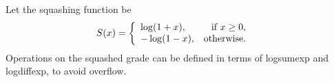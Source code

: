 \documentclass[a4paper, 12pt]{article}
\title{}
\author{Brendon J. Brewer}
\date{}
\begin{document}
\maketitle


\setlength{\parindent}{0pt}
\setlength{\parskip}{8pt}

Let the squashing function be
\begin{align}
S(x) &=
    \left\{
        \begin{array}{lr}
            \log (1 + x), & \textnormal{if } x \geq 0, \\
            -\log(1 - x), & \textnormal{otherwise}.
        \end{array}
    \right.
\end{align}
Operations on the squashed grade can be defined in terms of logsumexp
and logdiffexp, to avoid overflow.
\end{document}
